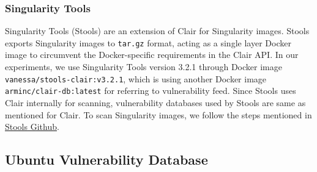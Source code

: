 \documentclass[a4paper,num-refs]{oup-contemporary}
\begin{document}
\subsubsection{Singularity Tools}

Singularity Tools (Stools)
are an extension of Clair for Singularity images. Stools
exports Singularity images to \texttt{tar.gz} format, acting as a single layer Docker image
to circumvent the Docker-specific requirements in the Clair API.
In our experiments, we use Singularity Tools version 3.2.1 through Docker
image
\texttt{vanessa/stools-clair:v3.2.1}, which is using another Docker
image \texttt{arminc/clair-db:latest} for referring to vulnerability feed.
Since Stools uses Clair internally for scanning, vulnerability databases used
by Stools are same as mentioned for Clair.
To scan Singularity images, we follow the steps mentioned in
\href{https://github.com/singularityhub/stools}{Stools Github}.

\subsection{Ubuntu Vulnerability Database}
\end{document}
